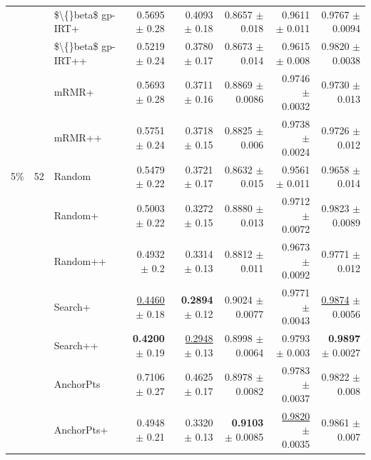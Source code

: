 \begin{longtable}{llp{}rrrrr}
 &  & \$\textbackslash\{\}beta\$ gp-IRT+ & 0.5695 {\scriptsize $\pm$ 0.28} & 0.4093 {\scriptsize $\pm$ 0.18} & 0.8657 {\scriptsize $\pm$ 0.018} & 0.9611 {\scriptsize $\pm$ 0.011} & 0.9767 {\scriptsize $\pm$ 0.0094} \\
 &  & \$\textbackslash\{\}beta\$ gp-IRT++ & 0.5219 {\scriptsize $\pm$ 0.24} & 0.3780 {\scriptsize $\pm$ 0.17} & 0.8673 {\scriptsize $\pm$ 0.014} & 0.9615 {\scriptsize $\pm$ 0.008} & 0.9820 {\scriptsize $\pm$ 0.0038} \\
 &  & mRMR+ & 0.5693 {\scriptsize $\pm$ 0.28} & 0.3711 {\scriptsize $\pm$ 0.16} & 0.8869 {\scriptsize $\pm$ 0.0086} & 0.9746 {\scriptsize $\pm$ 0.0032} & 0.9730 {\scriptsize $\pm$ 0.013} \\
 &  & mRMR++ & 0.5751 {\scriptsize $\pm$ 0.24} & 0.3718 {\scriptsize $\pm$ 0.15} & 0.8825 {\scriptsize $\pm$ 0.006} & 0.9738 {\scriptsize $\pm$ 0.0024} & 0.9726 {\scriptsize $\pm$ 0.012} \\
\midrule
5\% & 52 & Random & 0.5479 {\scriptsize $\pm$ 0.22} & 0.3721 {\scriptsize $\pm$ 0.17} & 0.8632 {\scriptsize $\pm$ 0.015} & 0.9561 {\scriptsize $\pm$ 0.011} & 0.9658 {\scriptsize $\pm$ 0.014} \\
 &  & Random+ & 0.5003 {\scriptsize $\pm$ 0.22} & 0.3272 {\scriptsize $\pm$ 0.15} & 0.8880 {\scriptsize $\pm$ 0.013} & 0.9712 {\scriptsize $\pm$ 0.0072} & 0.9823 {\scriptsize $\pm$ 0.0089} \\
 &  & Random++ & 0.4932 {\scriptsize $\pm$ 0.2} & 0.3314 {\scriptsize $\pm$ 0.13} & 0.8812 {\scriptsize $\pm$ 0.011} & 0.9673 {\scriptsize $\pm$ 0.0092} & 0.9771 {\scriptsize $\pm$ 0.012} \\
 &  & Search+ & \underline{0.4460} {\scriptsize $\pm$ 0.18} & \textbf{0.2894} {\scriptsize $\pm$ 0.12} & 0.9024 {\scriptsize $\pm$ 0.0077} & 0.9771 {\scriptsize $\pm$ 0.0043} & \underline{0.9874} {\scriptsize $\pm$ 0.0056} \\
 &  & Search++ & \textbf{0.4200} {\scriptsize $\pm$ 0.19} & \underline{0.2948} {\scriptsize $\pm$ 0.13} & 0.8998 {\scriptsize $\pm$ 0.0064} & 0.9793 {\scriptsize $\pm$ 0.003} & \textbf{0.9897} {\scriptsize $\pm$ 0.0027} \\
 &  & AnchorPts & 0.7106 {\scriptsize $\pm$ 0.27} & 0.4625 {\scriptsize $\pm$ 0.17} & 0.8978 {\scriptsize $\pm$ 0.0082} & 0.9783 {\scriptsize $\pm$ 0.0037} & 0.9822 {\scriptsize $\pm$ 0.008} \\
 &  & AnchorPts+ & 0.4948 {\scriptsize $\pm$ 0.21} & 0.3320 {\scriptsize $\pm$ 0.13} & \textbf{0.9103} {\scriptsize $\pm$ 0.0085} & \underline{0.9820} {\scriptsize $\pm$ 0.0035} & 0.9861 {\scriptsize $\pm$ 0.007} \\

\end{longtable}
